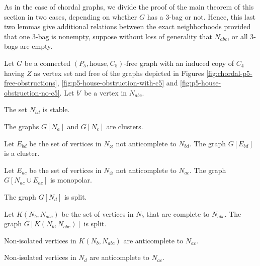 As in the case of chordal graphs, we divide the proof of the main theorem of
this section in two cases, depending on whether $G$ has a 3-bag or not. Hence,
this last two lemmas give additional relations between the exact neighborhoods
provided that one 3-bag is nonempty, suppose without loss of generality that
$N_{abc}$, or all 3-bags are empty.

\begin{lemma}
    Let $G$ be a connected $(P_5,\text{house},C_5)$-free graph with an induced
    copy of $C_4$ having $Z$ as vertex set and free of the graphs depicted in
    Figures \ref{fig:chordal-p5-free-obstructions},
    \ref{fig:p5-house-obstruction-with-c5} and
    \ref{fig:p5-house-obstruction-no-c5}. Let $b'$ be a vertex in $N_{abc}$.
    \begin{lemenum}
        \item The set $N_{bd}$ is stable. \label{lem:type_3bag_1}
        \item The graphs $G[N_a]$ and $G[N_c]$ are clusters.
            \label{lem:type_3bag_2}
        \item Let $E_{bd}$ be the set of vertices in $N_\varnothing$ not
            anticomplete to $N_{bd}$. The graph $G[E_{bd}]$ is a cluster.
            \label{lem:type_3bag_3}
        \item Let $E_{ac}$ be the set of vertices in $N_\varnothing$ not
            anticomplete to $N_{ac}$. The graph $G[N_{ac} \cup E_{ac}]$ is
            monopolar. \label{lem:type_3bag_4}
        \item The graph $G[N_d]$ is split. \label{lem:type_3bag_5}
        \item Let $K(N_b,N_{abc})$ be the set of vertices in $N_{b}$ that are
            complete to $N_{abc}$. The graph $G[K(N_b,N_{abc})]$ is split.
            \label{lem:type_3bag_51}
        \item Non-isolated vertices in $K(N_b,N_{abc})$ are anticomplete to
            $N_{ac}$. \label{lem:type_3bag_6}
        \item Non-isolated vertices in $N_d$ are anticomplete to $N_{ac}$.
        \label{lem:type_3bag_7}
    \end{lemenum} 
\end{lemma}

